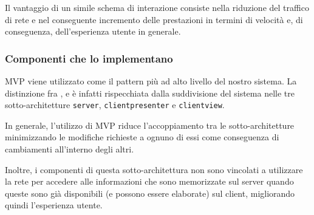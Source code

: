 Il vantaggio di un simile schema di interazione consiste nella riduzione del traffico di rete e nel conseguente incremento delle prestazioni in termini di velocità e, di conseguenza, dell'esperienza utente in generale.

\subsubsection{Componenti che lo implementano}
MVP viene utilizzato come il pattern più ad alto livello del nostro sistema. La distinzione fra ,  e  è infatti rispecchiata dalla suddivisione del sistema nelle tre sotto-architetture \texttt{server}, \texttt{clientpresenter} e \texttt{clientview}.

In generale, l'utilizzo di MVP riduce l'accoppiamento tra le sotto-architetture minimizzando le modifiche richieste a ognuno di essi come conseguenza di cambiamenti all'interno degli altri.

Inoltre, i componenti di questa sotto-architettura non sono vincolati a utilizzare la rete per accedere alle informazioni che sono memorizzate sul server quando queste sono già disponibili (e possono essere elaborate) sul client, migliorando quindi l'esperienza utente.

